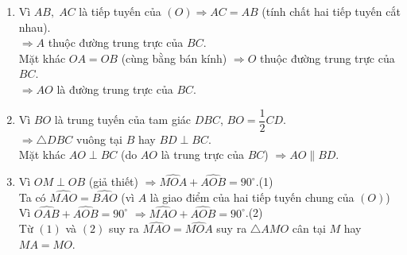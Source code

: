\begin{vd}
{\begin{center}
		\end{center}	
		\begin{enumerate}
			\item Vì $AB,\; AC$ là tiếp tuyến của $(O) \Rightarrow AC = AB$ (tính chất hai tiếp tuyến cắt nhau).\\
			$\Rightarrow A$ thuộc đường trung trực của $BC$.\\
			Mặt khác $OA = OB$ (cùng bằng bán kính) $\Rightarrow O$ thuộc đường trung trực của $BC$.\\
			$\Rightarrow AO$ là đường trung trực của $BC$.
			\item Vì $BO$ là trung tuyến của tam giác $DBC$, $BO = \dfrac{1}{2}CD$.\\ $\Rightarrow \triangle DBC$ vuông tại $B$ hay $BD\perp BC$.\\
			Mặt khác $AO\perp BC$ (do $AO$ là trung trực của $BC$) $\Rightarrow AO \parallel BD$.
			\item Vì $OM\perp OB$ (giả thiết) $\Rightarrow \widehat{MOA}+\widehat{AOB} = 90^\circ$.\hfill  (1)\\
			Ta có $\widehat{MAO}=\widehat{BAO}$ (vì $A$ là giao điểm của hai tiếp tuyến chung của $(O)$)\\
			Vì $\widehat{OAB}+\widehat{AOB} = 90^\circ$
			$\Rightarrow \widehat{MAO}+\widehat{AOB} = 90^\circ$.\hfill (2)\\
			Từ $(1)$ và $(2)$ suy ra $\widehat{MAO} = \widehat{MOA}$ suy ra $\triangle AMO$ cân tại $M$ hay $MA = MO$.
		\end{enumerate}			
	}	
\end{vd}


